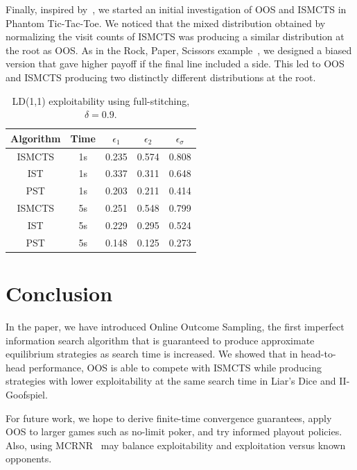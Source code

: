 \documentclass[letterpaper]{article}
\begin{document}
Finally, inspired by~\cite{Auger11Multiple}, we started an initial investigation of OOS and ISMCTS in Phantom Tic-Tac-Toe. 
We noticed that the mixed distribution obtained by normalizing the visit counts of ISMCTS was producing a 
similar distribution at the root as OOS. As in the Rock, Paper, Scissors example~\cite{Shafiei09}, 
we designed a biased version that gave higher payoff if the final line included a side. This 
led to OOS and ISMCTS producing two distinctly different distributions at the root. 

\begin{table}
{\small
\begin{center}
\begin{tabular}{ccccc}
Algorithm     & Time & $\epsilon_1$ & $\epsilon_2$ & $\epsilon_\sigma$ \\
\hline
ISMCTS        & 1s   & 0.235  & 0.574  & 0.808 \\
IST           & 1s   & 0.337  & 0.311  & 0.648 \\
PST           & 1s   & 0.203  & 0.211  & 0.414 \\
\hline
ISMCTS        & 5s   & 0.251  & 0.548  & 0.799 \\
IST           & 5s   & 0.229  & 0.295  & 0.524 \\
PST           & 5s   & 0.148  & 0.125  & 0.273 \\
\hline
\end{tabular}
\caption{LD(1,1) exploitability using full-stitching, $\delta = 0.9$.} 
\label{tbl:fullstitching}
\end{center}
}
\end{table}


\section{Conclusion}

In the paper, we have introduced Online Outcome Sampling, the first 
imperfect information search algorithm that is guaranteed to produce 
approximate equilibrium strategies as search time is increased. We 
showed that in head-to-head performance, OOS is able to compete with 
ISMCTS while producing strategies with lower exploitability
at the same search time in Liar's Dice and II-Goofspiel.

For future work, we hope to derive finite-time convergence guarantees, 
apply OOS to larger games such as no-limit poker, and try informed playout
policies. 
Also, using MCRNR~\cite{Ponsen11Computing} 
may balance exploitability and exploitation versus known opponents.



\end{document}
